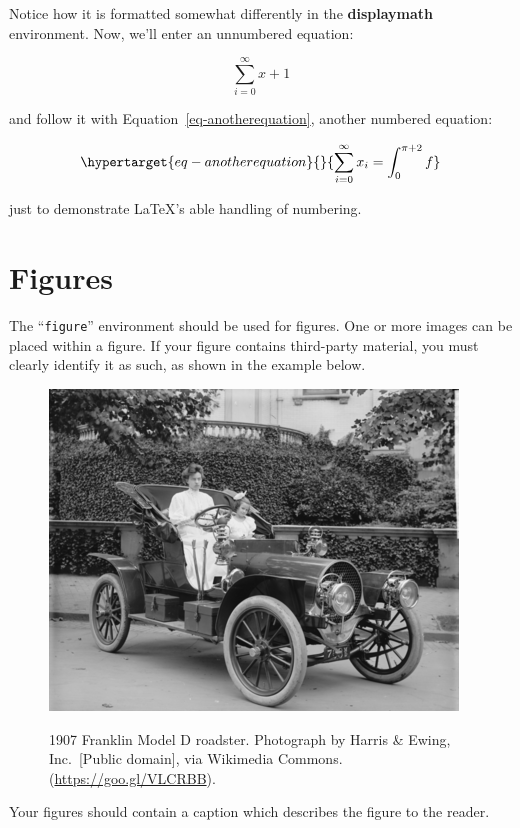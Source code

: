 \documentclass[manuscript,screen,review]{acmart}
\begin{document}
Notice how it is formatted somewhat differently in the
\textbf{displaymath} environment. Now, we'll enter an unnumbered
equation:

\[\sum_{i=0}^{\infty} x + 1\]

and follow it with Equation~\ref{eq-anotherequation}, another numbered
equation:

\begin{equation}\protect\hypertarget{eq-anotherequation}{}{
\sum_{i=0}^{\infty}x_i=\int_{0}^{\pi+2} f
}\label{eq-anotherequation}\end{equation}

just to demonstrate \LaTeX's able handling of numbering.

\hypertarget{figures}{%
\section{Figures}\label{figures}}

The ``\texttt{figure}'' environment should be used for figures. One or
more images can be placed within a figure. If your figure contains
third-party material, you must clearly identify it as such, as shown in
the example below.

\begin{figure}
{\centering \includegraphics{sample-franklin.png}}
\caption{1907 Franklin Model D roadster. Photograph by Harris \& Ewing,
Inc.~{[}Public domain{]}, via Wikimedia Commons.
(\url{https://goo.gl/VLCRBB}).}
\end{figure}

Your figures should contain a caption which describes the figure to the
reader.
\end{document}
